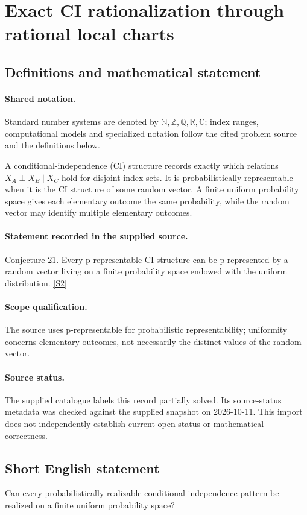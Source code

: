 \documentclass[11pt]{article}
\newcommand{\sref}[2]{\hyperlink{source:#1:#2}{[S#2]}}
\begin{document}
\section{Exact CI rationalization through rational local charts}\label{statement}

\subsection{Definitions and mathematical statement}

\paragraph{Shared notation.}Standard number systems are denoted by $\mathbb N,\mathbb Z,\mathbb Q,\mathbb R,\mathbb C$; index ranges, computational models and specialized notation follow the cited problem source and the definitions below.


A conditional-independence (CI) structure records exactly which relations $X_A\perp X_B\mid X_C$ hold for disjoint index sets. It is probabilistically representable when it is the CI structure of some random vector. A finite uniform probability space gives each elementary outcome the same probability, while the random vector may identify multiple elementary outcomes.
\paragraph{Statement recorded in the supplied source.}
Conjecture 21. Every p-representable CI-structure can be p-represented by a random vector living on a finite probability space endowed with the uniform distribution. \sref{statement}{2}
\paragraph{Scope qualification.}
The source uses p-representable for probabilistic representability; uniformity concerns elementary outcomes, not necessarily the distinct values of the random vector.
\paragraph{Source status.}
The supplied catalogue labels this record partially solved. Its source-status metadata was checked against the supplied snapshot on 2026-10-11. This import does not independently establish current open status or mathematical correctness.
\subsection{Short English statement}
Can every probabilistically realizable conditional-independence pattern be realized on a finite uniform probability space?
\end{document}
